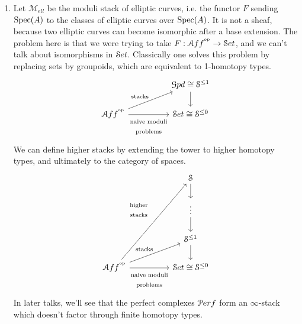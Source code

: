 \documentclass[10pt,a4paper,reqno,oneside]{book} %
\theoremstyle{plain}
\theoremstyle{definition}
\theoremstyle{remark}
\numberwithin{equation}{section}
\begin{document}
\begin{enumerate}
\item Let $\mathcal{M}_{ell}$ be the moduli stack of elliptic curves, i.e. the functor $F$ sending
$\operatorname{Spec}(A)$ to the classes of elliptic curves over $\operatorname{Spec}(A)$. It is not a sheaf, because two elliptic curves can become
isomorphic after a base extension. The problem here is that we were trying to take $F : \mathcal A ff^{^\mathrm{op}} \to \mathcal S et$, and we can't talk
about isomorphisms in $\mathcal S et$. Classically one solves this problem by replacing sets by groupoids, which are equivalent to
1-homotopy types.
\[
\begin{tikzcd}
\; & & \cG pd \cong \cS^{\leq 1}\arrow{d} \\
\cA ff^{\op}\arrow{urr}{\text{stacks}}\arrow[swap]{rr}{\begin{array}{c}\text{naive moduli}\\
\text{problems}\end{array}} & & \cS et \cong \cS^{\leq 0}
\end{tikzcd}
\]
We can define higher stacks by extending the tower to higher homotopy types, and ultimately to the category of spaces.
\[
\begin{tikzcd}
\; & &  \cS\arrow{d} \\
\; & &  \vdots\arrow{d} \\
\; & &  \cS^{\leq 1}\arrow{d} \\
\cA ff^{\op}\arrow{uuurr}{\begin{array}{c}\text{higher}\\\text{stacks}\end{array}}
\arrow{urr}{\text{stacks}}\arrow[swap]{rr}{\begin{array}{c}\text{naive moduli}\\\text{problems}\end{array}} & & 
\cS et \cong \cS^{\leq 0}
\end{tikzcd}
\]
In later talks, we'll
see that the perfect complexes $\mathcal P erf$ form an $\infty$-stack which doesn't factor through finite homotopy types.
\end{enumerate}
\end{document}
